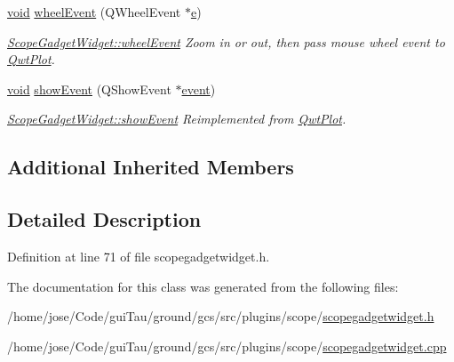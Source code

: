 \begin{DoxyCompactItemize}
\hyperlink{group___u_a_v_objects_plugin_ga444cf2ff3f0ecbe028adce838d373f5c}{void} \hyperlink{group__scopeplugin_ga1cf4485edf803c91fec9d29e6f33dfd8}{wheel\-Event} (Q\-Wheel\-Event $\ast$\hyperlink{_o_p_plots_8m_a9425be9aab51621e317ba7ade564b570}{e})
\begin{DoxyCompactList}\small\item\em \hyperlink{group__scopeplugin_ga1cf4485edf803c91fec9d29e6f33dfd8}{Scope\-Gadget\-Widget\-::wheel\-Event} Zoom in or out, then pass mouse wheel event to \hyperlink{class_qwt_plot}{Qwt\-Plot}. \end{DoxyCompactList}\item 
\hyperlink{group___u_a_v_objects_plugin_ga444cf2ff3f0ecbe028adce838d373f5c}{void} \hyperlink{group__scopeplugin_ga323510a973ec27e6c976ec2748cfcaa6}{show\-Event} (Q\-Show\-Event $\ast$\hyperlink{class_qwt_plot_af40d1bfdd9b6cd94e9981db8b254b961}{event})
\begin{DoxyCompactList}\small\item\em \hyperlink{group__scopeplugin_ga323510a973ec27e6c976ec2748cfcaa6}{Scope\-Gadget\-Widget\-::show\-Event} Reimplemented from \hyperlink{class_qwt_plot}{Qwt\-Plot}. \end{DoxyCompactList}\end{DoxyCompactItemize}
\subsection*{Additional Inherited Members}


\subsection{Detailed Description}


Definition at line 71 of file scopegadgetwidget.\-h.



The documentation for this class was generated from the following files\-:\begin{DoxyCompactItemize}
\item 
/home/jose/\-Code/gui\-Tau/ground/gcs/src/plugins/scope/\hyperlink{scopegadgetwidget_8h}{scopegadgetwidget.\-h}\item 
/home/jose/\-Code/gui\-Tau/ground/gcs/src/plugins/scope/\hyperlink{scopegadgetwidget_8cpp}{scopegadgetwidget.\-cpp}\end{DoxyCompactItemize}
